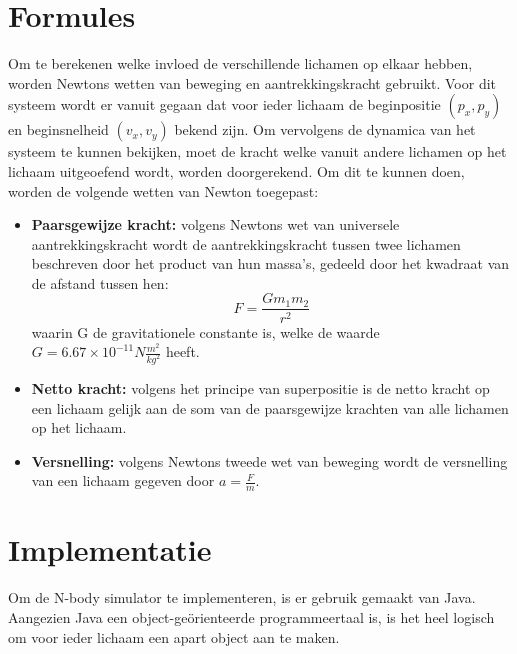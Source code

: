 \documentclass[12pt]{article}
\begin{document}
\section{Formules}
Om te berekenen welke invloed de verschillende lichamen op elkaar hebben, worden Newtons wetten van beweging en aantrekkingskracht gebruikt. Voor dit systeem wordt er vanuit gegaan dat voor ieder lichaam de beginpositie $(p_x, p_y)$ en beginsnelheid $(v_x, v_y)$ bekend zijn. Om vervolgens de dynamica van het systeem te kunnen bekijken, moet de kracht welke vanuit andere lichamen op het lichaam uitgeoefend wordt, worden doorgerekend. Om dit te kunnen doen, worden de volgende wetten van Newton toegepast:
\begin{itemize}
\item \textbf{Paarsgewijze kracht:} volgens Newtons wet van universele aantrekkingskracht wordt de aantrekkingskracht tussen twee lichamen beschreven door het product van hun massa's, gedeeld door het kwadraat van de afstand tussen hen: 
\begin{equation}
F = \frac{Gm_1m_2}{r^2}
\end{equation}
waarin G de gravitationele constante is, welke de waarde $G = 6.67 \times 10^{-11} N \frac{m^2}{kg^2}$ heeft. 
\item \textbf{Netto kracht:} volgens het principe van superpositie is de netto kracht op een lichaam gelijk aan de som van de paarsgewijze krachten van alle lichamen op het lichaam.
\item \textbf{Versnelling:} volgens Newtons tweede wet van beweging wordt de versnelling van een lichaam gegeven door $a = \frac{F}{m}$.
\end{itemize}
\section{Implementatie}
Om de N-body simulator te implementeren, is er gebruik gemaakt van Java. Aangezien Java een object-ge\"orienteerde programmeertaal is, is het heel logisch om voor ieder lichaam een apart object aan te maken. 
\end{document}
